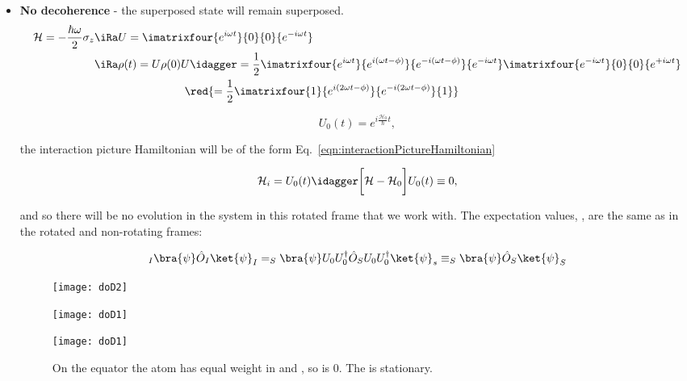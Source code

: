  \begin{itemize}
 \item \textbf{ No  decoherence} - the superposed state
   will remain superposed.
   \[
     \begin{aligned}
       \mathcal{H} = -\frac{\hbar\omega}{2}\sigma_z &\iRa  U = \imatrixfour{e^{i\omega t}}{0}{0}{e^{-i\omega t}}\\
       &\iRa \rho(t) = U\rho(0)U\idagger = \frac{1}{2}\imatrixfour{e^{i\omega t}}{e^{i(\omega t - \phi)}}{e^{-i(\omega t - \phi)}}{e^{-i\omega t}}\imatrixfour{e^{-i\omega t}}{0}{0}{e^{+i\omega t}}\\
       &\qquad                                 \qquad\qquad\qquad\red{=
         \frac{1}{2}\imatrixfour{1}{e^{i(2\omega t - \phi)}}{e^{-i(2\omega
             t - \phi)}}{1}}
     \end{aligned}
   \]


  \[
    U_0(t) = e^{i\frac{\mathcal{H}_0}{\hbar}t},
  \]

  \noindent the  interaction picture  Hamiltonian will  be of  the form
  Eq.~\eqref{eqn:interactionPictureHamiltonian}

  \[
    \mathcal{H}_i       =       U_0(t)\idagger\bigg[\mathcal{H}       -
    \mathcal{H}_0\bigg]U_0(t) \equiv 0,
  \]

  \noindent and  so there will  be no evolution  in the system  in this
  rotated frame that  we work with.  The  expectation values, \isigmax,
  \isigmaz are the same as in the rotated and non-rotating frames:

  \begin{equation}
    _I\bra{\psi}\hat{O}_I\ket{\psi}_I = _S\bra{\psi}U_0U_0^\dagger\hat{O}_SU_0U_0^\dagger\ket{\psi}_s \equiv _S\bra{\psi}\hat{O}_S\ket{\psi}_S
  \end{equation}

\begin{figure}[h]
  \centering \texttt{[image: doD2]}
\end{figure}

\begin{figure}[h]
  \centering \texttt{[image: doD1]}
  \caption{\small }
\end{figure}

  \begin{figure}[h]
    \centering \texttt{[image: doD1]}
    \caption{\small  On  the  equator  the atom  has  equal  weight  in
        and  ,  so  \isigmaz is  0.   The  \isigmax  is
      stationary.}
  \end{figure}


\end{itemize}
